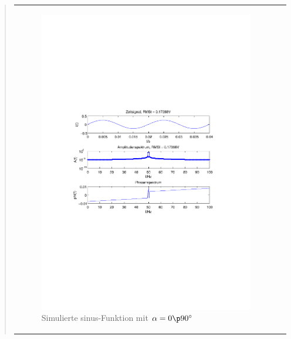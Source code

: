 \begin{quote}
\begin{center}
\begin{tabular}{ll}
\begin{minipage}{0.6\textwidth}
                \begin{figure}[H]
                    \label{fig:sin_f-50_a-0}
                    \includegraphics[scale=0.55, trim = 35mm 100mm 35mm 95mm, clip]{Bilder/sin_f-50_a-0}
                    \caption{Simulierte sinus-Funktion mit $\alpha = 0 \p 90^\circ$}
                \end{figure}
        
            \end{minipage}
        

\end{tabular}
\end{center}
\end{quote}
